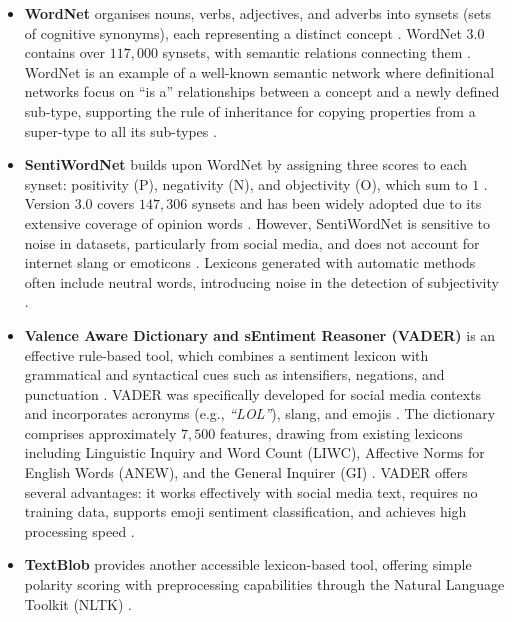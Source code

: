 \documentclass[a4paper,twoside,12pt]{book}
\newcommand{\literal}[1]{\textit{``#1''}}
\begin{document}
\begin{itemize}	
\item \textbf{WordNet} organises nouns, verbs, adjectives, and adverbs into synsets (sets of cognitive synonyms), each representing a distinct concept \cite{nursal2025battle}. WordNet $3.0$ contains over $117{,}000$ synsets, with semantic relations connecting them \cite{nursal2025battle}. WordNet is an example of a well-known semantic network where definitional networks focus on ``is a'' relationships between a concept and a newly defined sub-type, supporting the rule of inheritance for copying properties from a super-type to all its sub-types \cite{CHATURVEDI201865}.

\item \textbf{SentiWordNet} builds upon WordNet by assigning three scores to each synset: positivity (P), negativity (N), and objectivity (O), which sum to $1$ \cite{nursal2025battle}. Version $3.0$ covers $147{,}306$ synsets and has been widely adopted due to its extensive coverage of opinion words \cite{nursal2025battle}. However, SentiWordNet is sensitive to noise in datasets, particularly from social media, and does not account for internet slang or emoticons \cite{nursal2025battle}. Lexicons generated with automatic methods often include neutral words, introducing noise in the detection of subjectivity \cite{CHATURVEDI201865}.

\item \textbf{Valence Aware Dictionary and sEntiment Reasoner (VADER)} \cite{hutto2015vader} is an effective rule-based tool, which combines a sentiment lexicon with grammatical and syntactical cues such as intensifiers, negations, and punctuation \cite{nursal2025battle}. VADER was specifically developed for social media contexts and incorporates acronyms (e.g., \literal{LOL}), slang, and emojis \cite{nursal2025battle}. The dictionary comprises approximately $7{,}500$ features, drawing from existing lexicons including Linguistic Inquiry and Word Count (LIWC), Affective Norms for English Words (ANEW), and the General Inquirer (GI) \cite{nursal2025battle}. VADER offers several advantages: it works effectively with social media text, requires no training data, supports emoji sentiment classification, and achieves high processing speed \cite{nursal2025battle}.

\item \textbf{TextBlob} provides another accessible lexicon-based tool, offering simple polarity scoring with preprocessing capabilities through the Natural Language Toolkit (NLTK) \cite{nursal2025battle}.
\end{itemize}
\end{document}
